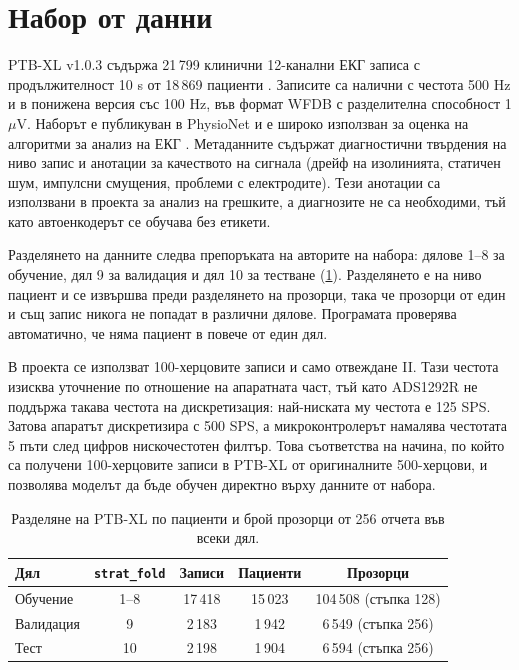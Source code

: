 \documentclass[12pt,a4paper]{article}
\begin{document}
\section{Набор от данни}
\label{sec:data}
PTB-XL v1.0.3 съдържа 21\,799 клинични 12-канални ЕКГ записа с продължителност 10 s от 18\,869 пациенти \cite{wagner2020ptbxl,wagner2022ptbxlphysionet}. Записите са налични с честота 500 Hz и в понижена версия със 100 Hz, във формат WFDB с разделителна способност 1 \(\mu\)V. Наборът е публикуван в PhysioNet \cite{goldberger2000physionet} и е широко използван за оценка на алгоритми за анализ на ЕКГ \cite{strodthoff2021deep}. Метаданните съдържат диагностични твърдения на ниво запис и анотации за качеството на сигнала (дрейф на изолинията, статичен шум, импулсни смущения, проблеми с електродите). Тези анотации са използвани в проекта за анализ на грешките, а диагнозите не са необходими, тъй като автоенкодерът се обучава без етикети.

Разделянето на данните следва препоръката на авторите на набора: дялове 1--8 за обучение, дял 9 за валидация и дял 10 за тестване (\cref{tab:split}). Разделянето е на ниво пациент и се извършва преди разделянето на прозорци, така че прозорци от един и същ запис никога не попадат в различни дялове. Програмата проверява автоматично, че няма пациент в повече от един дял.

В проекта се използват 100-херцовите записи и само отвеждане II. Тази честота изисква уточнение по отношение на апаратната част, тъй като ADS1292R не поддържа такава честота на дискретизация: най-ниската му честота е 125 SPS. Затова апаратът дискретизира с 500 SPS, а микроконтролерът намалява честотата 5 пъти след цифров нискочестотен филтър. Това съответства на начина, по който са получени 100-херцовите записи в PTB-XL от оригиналните 500-херцови, и позволява моделът да бъде обучен директно върху данните от набора.

\begin{table}[htbp]
    \centering
    \begin{tabular}{l c c c c}
        \toprule
        Дял & \texttt{strat\_fold} & Записи & Пациенти & Прозорци \\
        \midrule
        Обучение & 1--8 & 17\,418 & 15\,023 & 104\,508 (стъпка 128) \\
        Валидация & 9 & 2\,183 & 1\,942 & 6\,549 (стъпка 256) \\
        Тест & 10 & 2\,198 & 1\,904 & 6\,594 (стъпка 256) \\
        \bottomrule
    \end{tabular}
    \caption{Разделяне на PTB-XL по пациенти и брой прозорци от 256 отчета във всеки дял.}
    \label{tab:split}
\end{table}
\end{document}
